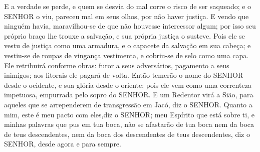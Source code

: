 {E a verdade se perde, e quem se desvia do mal corre o risco de ser saqueado; e o SENHOR o viu, pareceu mal em seus olhos, por não haver justiça.
E vendo que ninguém havia, maravilhou-se de que não houvesse intercessor algum; por isso seu próprio braço lhe trouxe a salvação, e sua própria justiça o susteve.
Pois ele se vestu de justiça como uma armadura, e
{} o capacete da salvação em sua cabeça; e vestiu-se de roupas de vingança
{} vestimenta, e cobriu-se de selo como uma capa.
Ele
{} retribuirá conforme
{} obras: furor a seus adversários, pagamento a seus inimigos; aos litorais ele pagará de volta.
Então temerão o nome do SENHOR desde o ocidente, e sua glória desde o oriente; pois ele vem como uma correnteza impetuosa, empurrada pelo sopro
 do SENHOR.
E um Redentor virá a Sião, para aqueles que se arrependerem de
{} transgressão em Jacó, diz o SENHOR.
Quanto a mim, este é meu pacto com eles,diz o SENHOR; meu Espírito que está sobre ti, e minhas palavras que pus em tua boca, não se afastarão de tua boca nem da boca de teus descendentes,
 nem da boca dos descendentes de teus descendentes, diz o SENHOR, desde agora e para sempre.

}
